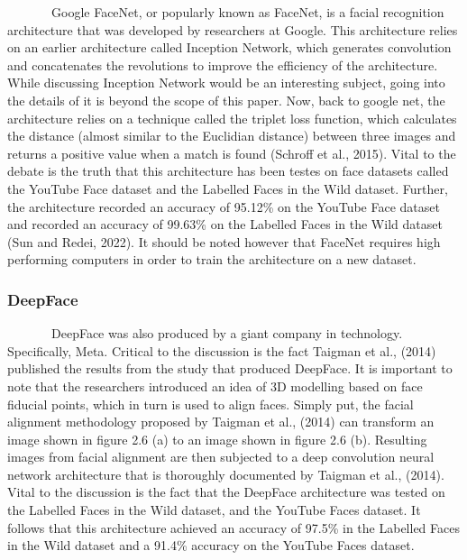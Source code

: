 \documentclass[
  12pt,
]{article}
\begin{document}
~~~~~~~Google FaceNet, or popularly known as FaceNet, is a facial
recognition architecture that was developed by researchers at Google.
This architecture relies on an earlier architecture called Inception
Network, which generates convolution and concatenates the revolutions to
improve the efficiency of the architecture. While discussing Inception
Network would be an interesting subject, going into the details of it is
beyond the scope of this paper. Now, back to google net, the
architecture relies on a technique called the triplet loss function,
which calculates the distance (almost similar to the Euclidian distance)
between three images and returns a positive value when a match is found
(Schroff et al., 2015). Vital to the debate is the truth that this
architecture has been testes on face datasets called the YouTube Face
dataset and the Labelled Faces in the Wild dataset. Further, the
architecture recorded an accuracy of 95.12\% on the YouTube Face dataset
and recorded an accuracy of 99.63\% on the Labelled Faces in the Wild
dataset (Sun and Redei, 2022). It should be noted however that FaceNet
requires high performing computers in order to train the architecture on
a new dataset.

\subsubsection{DeepFace}\label{deepface}

~~~~~~~DeepFace was also produced by a giant company in technology.
Specifically, Meta. Critical to the discussion is the fact Taigman et
al., (2014) published the results from the study that produced DeepFace.
It is important to note that the researchers introduced an idea of 3D
modelling based on face fiducial points, which in turn is used to align
faces. Simply put, the facial alignment methodology proposed by Taigman
et al., (2014) can transform an image shown in figure 2.6 (a) to an
image shown in figure 2.6 (b). Resulting images from facial alignment
are then subjected to a deep convolution neural network architecture
that is thoroughly documented by Taigman et al., (2014). Vital to the
discussion is the fact that the DeepFace architecture was tested on the
Labelled Faces in the Wild dataset, and the YouTube Faces dataset. It
follows that this architecture achieved an accuracy of 97.5\% in the
Labelled Faces in the Wild dataset and a 91.4\% accuracy on the YouTube
Faces dataset.
\end{document}
